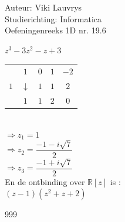 \documentclass[a4paper]{article}
\begin{document}
  
\noindent \large Auteur: Viki Lauvrys        \\
\noindent \large Studierichting: Informatica \\
\noindent \large Oefeningenreeks 1D nr. 19.6 \\

\medskip

\normalsize

$ z^3 -3z^2 -z +3 $ \\

\begin{tabular} {c|cccc} 
                  & $1$          & $0$ & $1$                      & $-2$  \\      
  $1$  						& $\downarrow$ & $1$ & $1$                      & $2$   \\ \hline            
	                & $1$          & $1$ & \multicolumn{1}{c|}{$2$} & $0$ 
\end{tabular} \\

$ \Rightarrow z_1 = 1 $ \\

$ \Rightarrow z_2 = \dfrac{-1 - i \sqrt{7}}{2} $ \\

$ \Rightarrow z_3 = \dfrac{-1 + i \sqrt{7}}{2} $ \\

En de ontbinding over $\mathbb{R}[z]$ is : \\

$ (z-1)(z^2 + z +2) $ \\

\begin{thebibliography}{999}
\end{thebibliography}
\end{document}
